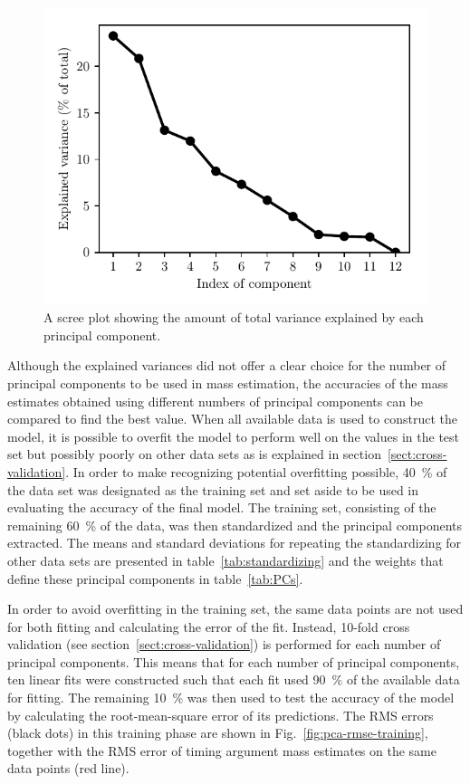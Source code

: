 \documentclass[english, twoside]{HYgradu}
\begin{document}
\begin{figure}
    \centering
    \includegraphics{kuvat/PCA/scree.pdf}
    \caption{A scree plot showing the amount of total variance explained by each principal component.}\label{fig:pca-scree}
\end{figure}


Although the explained variances did not offer a clear choice for the number of principal components to be used in mass estimation, the accuracies of the mass estimates obtained using different numbers of principal components can be compared to find the best value. When all available data is used to construct the model, it is possible to overfit the model to perform well on the values in the test set but possibly poorly on other data sets as is explained in section~\ref{sect:cross-validation}. In order to make recognizing potential overfitting possible, 40~\% of the data set was designated as the training set and set aside to be used in evaluating the accuracy of the final model. The training set, consisting of the remaining 60~\% of the data, was then standardized and the principal components extracted. The means and standard deviations for repeating the standardizing for other data sets are presented in table~\ref{tab:standardizing} and the weights that define these principal components in table~\ref{tab:PCs}.

In order to avoid overfitting in the training set, the same data points are not used for both fitting and calculating the error of the fit. Instead, 10-fold cross validation (see section~\ref{sect:cross-validation}) is performed for each number of principal components. 
This means that for each number of principal components, ten linear fits were constructed such that each fit used 90~\% of the available data for fitting. The remaining 10~\% was then used to test the accuracy of the model by calculating the root-mean-square error of its predictions. The RMS errors (black dots) in this training phase are shown in Fig.~\ref{fig:pca-rmse-training}, together with the RMS error of timing argument mass estimates on the same data points (red line).
\end{document}
